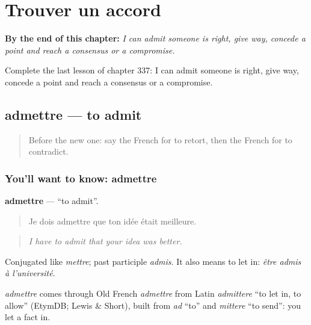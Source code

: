 
\chapter{Trouver un accord}
\label{ch:fr-trouver-un-accord}

\begin{chapteropening}
\textbf{By the end of this chapter:} \emph{I can admit someone is right, give way, concede a point and reach a consensus or a compromise.}

Complete the last lesson of chapter 337: I can admit someone is right, give way, concede a point and reach a consensus or a compromise.
\end{chapteropening}

\section[admettre]{admettre — to admit}

\label{lesson:FR-C337-admettre}



\begin{quote}
Before the new one: say the French for to retort, then the French for to contradict.
\end{quote}

\subsection*{You'll want to know: admettre}
\textbf{admettre} — \textquotedblleft{}to admit\textquotedblright{}.

\begin{quote}
Je dois admettre que ton idée était meilleure.
\end{quote}

\begin{quote}
\emph{I have to admit that your idea was better.}
\end{quote}

Conjugated like \emph{mettre}; past participle \emph{admis}. It also means to let in: \emph{être admis à l'université}.

\begin{cousinweb}
\emph{admettre} comes through Old French \emph{admettre} from Latin \emph{admittere} \textquotedblleft{}to let in, to allow\textquotedblright{} (EtymDB; Lewis \& Short), built from \emph{ad} \textquotedblleft{}to\textquotedblright{} and \emph{mittere} \textquotedblleft{}to send\textquotedblright{}: you let a fact in.
\end{cousinweb}

